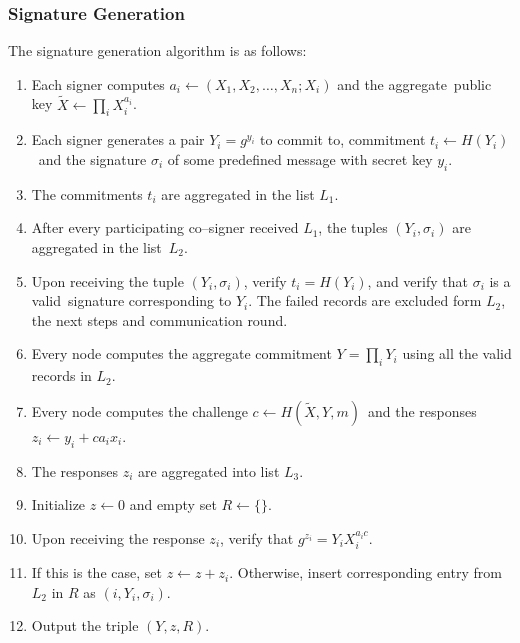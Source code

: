 \subsubsection{Signature Generation}
The signature generation algorithm is as follows:
\begin{enumerate}
    \item Each signer computes $a_i\leftarrow(X_1,X_2,\dots,X_n;X_i)$ and the aggregate\
    public key $\tilde{X}\leftarrow\prod_i X_i^{a_i}$.
    \item Each signer generates a pair $Y_i=g^{y_i}$ to commit to, commitment $t_i\leftarrow H(Y_i)$\
    and the signature $\sigma_i$ of some predefined message with secret key $y_i$.
    \item The commitments $t_i$ are aggregated in the list $L_1$.
    \item After every participating co--signer received $L_1$, the tuples $(Y_i,\sigma_i)$ are aggregated in the list\
    $L_2$.
    \item Upon receiving the tuple $(Y_i,\sigma_i)$, verify $t_i = H(Y_i)$, and verify that $\sigma_i$ is a valid\
    signature corresponding to $Y_i$.
    The failed records are excluded form $L_2$, the next steps and communication round.
    \item Every node computes the aggregate commitment $Y=\prod_i Y_i$ using all the valid records in $L_2$.
    \item Every node computes the challenge $c\leftarrow H(\tilde{X}, Y, m)$\
    and the responses $z_i\leftarrow y_i + ca_ix_i$.
    \item The responses $z_i$ are aggregated into list $L_3$.
    \item Initialize $z\leftarrow 0$ and empty set $R\leftarrow\{\}$.
    \item Upon receiving the response $z_i$, verify that $g^{z_i} = Y_i X_i^{a_ic}$.
    \item If this is the case, set $z\leftarrow z+z_i$.
    Otherwise, insert corresponding entry from $L_2$ in $R$ as $(i, Y_i, \sigma_i)$.
    \item Output the triple $(Y,z,R)$.
\end{enumerate}

